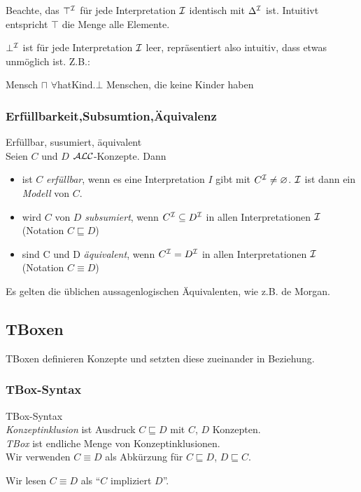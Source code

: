 Beachte, das $\top^{\mathcal{I}}$ für jede Interpretation $\mathcal{I}$ identisch mit $\Delta^{\mathcal{I}}$ ist. Intuitivt entspricht $\top$ die Menge alle Elemente. 

$\bot^{\mathcal{I}}$ ist für jede Interpretation $\mathcal{I}$ leer, repräsentiert also intuitiv, dass etwas unmöglich ist. Z.B.:

Mensch $\sqcap$ $\forall$hatKind.$\bot$
Menschen, die keine Kinder haben

{\subsubsection{Erfüllbarkeit,Subsumtion,Äquivalenz}\label{erfuxfcllbarkeit-subsumtion-uxe4quivalenz}}

\begin{definition}{Erfüllbar, susumiert, äquivalent} \\
Seien $C$ und $D$ $\mathcal{A}\mathcal{L}\mathcal{C}$-Konzepte. Dann

\begin{itemize}
\item
  ist $C$ \emph{erfüllbar}, wenn es eine Interpretation $I$ gibt mit
  $C^{\mathcal{I}} \neq \varnothing$. $\mathcal{I}$ ist dann ein \emph{Modell} von
  $C$.
\item
  wird $C$ von $D$ \emph{subsumiert}, wenn $C^{\mathcal{I}} \subseteq D^{\mathcal{I}}$
  in allen Interpretationen $\mathcal{I}$ (Notation $C \sqsubseteq D$)
\item
  sind C und D \emph{äquivalent}, wenn $C^{\mathcal{I}} = D^{\mathcal{I}}$ in allen
  Interpretationen $\mathcal{I}$ (Notation $C \equiv D$)
\end{itemize}
\end{definition}

Es gelten die üblichen aussagenlogischen Äquivalenten, wie z.B. de
Morgan.

\subsection{TBoxen}\label{tboxen}

TBoxen definieren Konzepte und setzten diese zueinander in Beziehung.

\subsubsection{TBox-Syntax}\label{tboxsyntax}

\begin{definition}{TBox-Syntax} \\
\emph{Konzeptinklusion} ist Ausdruck $C \sqsubseteq D$ mit $C$, $D$ Konzepten. \\
\emph{TBox} ist endliche Menge von Konzeptinklusionen. \\
Wir verwenden $C \equiv D$ als Abkürzung für $C \sqsubseteq D$, $D \sqsubseteq C$. 

Wir lesen $C \equiv D$ als ``$C$ impliziert $D$''.
\end{definition}

